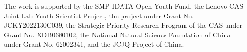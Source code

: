 \documentclass[sigconf]{acmart}
\begin{document}
\begin{acks}
The work is supported by the SMP-IDATA Open Youth Fund, the Lenovo-CAS Joint Lab Youth Scientist Project, the project under Grant No. JCKY2022130C039, the Strategic Priority Research Program of the CAS under Grant No. XDB0680102, the National Natural Science Foundation of China under Grant No. 62002341, and the JCJQ Project of China.
\end{acks}


\balance



\end{document}
